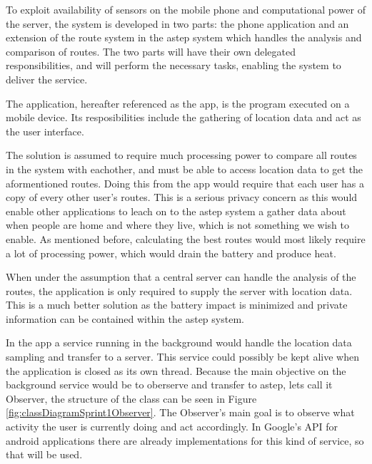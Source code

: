 To exploit availability of sensors on the mobile phone and computational power of the server, the system is developed in two parts: the phone application and an extension of the route system in the \gls{astep} system which handles the analysis and comparison of routes.
The two parts will have their own delegated responsibilities, and will perform the necessary tasks, enabling the system to deliver the service.

The application, hereafter referenced as the app, is the program executed on a mobile device.
Its resposibilities include the gathering of location data and act as the user interface. 

The solution is assumed to require much processing power to compare all routes in the system with eachother, and must be able to access location data to get the aformentioned routes.
Doing this from the app would require that each user has a copy of every other user's routes.
This is a serious privacy concern as this would enable other applications to leach on to the \gls{astep} system a gather data about when people are home and where they live, which is not something we wish to enable.
As mentioned before, calculating the best routes would most likely require a lot of processing power, which would drain the battery and produce heat.

When under the assumption that a central server can handle the analysis of the routes, the application is only required to supply the server with location data.
This is a much better solution as the battery impact is minimized and private information can be contained within the \gls{astep} system.

%	

In the app a service running in the background would handle the location data sampling and transfer to a server.
This service could possibly be kept alive when the application is closed as its own thread.
Because the main objective on the background service would be to oberserve and transfer to \gls{astep}, lets call it Observer, the structure of the class can be seen in Figure \ref{fig:classDiagramSprint1Observer}.
The Observer's main goal is to observe what activity the user is currently doing and act accordingly.
In Google's API for android applications there are already implementations for this kind of service, so that will be used.

